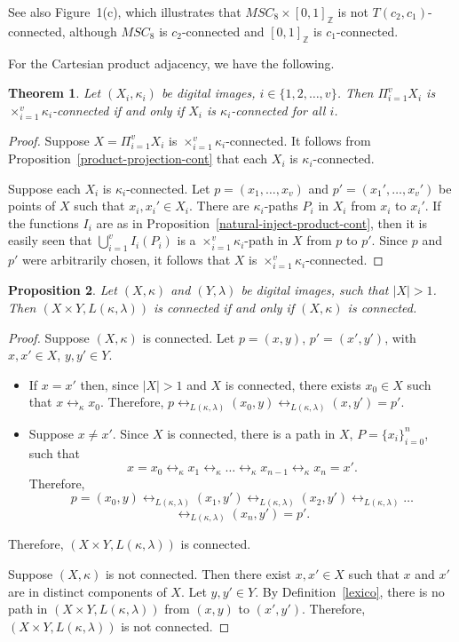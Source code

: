 \documentclass{article}
\theoremstyle{plain}
\newtheorem{thm}{Theorem}
\newtheorem{prop}[thm]{Proposition}
\theoremstyle{definition}
\numberwithin{thm}{section}
\newcommand{\adj}{\leftrightarrow}
\def\Z{{\mathbb Z}}
\begin{document}
See also %
Figure~1(c),
which illustrates that $MSC_8 \times [0,1]_{\Z}$ is
not $T(c_2,c_1)$-connected, although $MSC_8$ is $c_2$-connected and
$[0,1]_{\Z}$ is $c_1$-connected.

For the Cartesian product adjacency, we have the following.


\begin{thm}
\label{product-Pi-conn}
Let $(X_i,\kappa_i)$ be digital images, $i \in \{1,2, \ldots, v\}$. Then
$\Pi_{i=1}^v X_i$ is $\times_{i=1}^v \kappa_i$-connected if and only if $X_i$ is $\kappa_i$-connected for all $i$.
\end{thm}

\begin{proof}
Suppose $X=\Pi_{i=1}^v X_i$ is $\times_{i=1}^v \kappa_i$-connected. It follows from Proposition~\ref{product-projection-cont} that each $X_i$ is
$\kappa_i$-connected.

Suppose each $X_i$ is $\kappa_i$-connected. Let $p = (x_1, \ldots, x_v)$
and $p' = (x_1', \ldots, x_v')$ be points of $X$ such that
$x_i, x_i' \in X_i$. There are $\kappa_i$-paths $P_i$ in $X_i$ from
$x_i$ to $x_i'$. If the functions $I_i$ are as in
Proposition~\ref{natural-inject-product-cont}, then it is easily seen that
$\bigcup_{i=1}^v I_i(P_i)$ is a $\times_{i=1}^v \kappa_i$-path in $X$ from
$p$ to $p'$. Since $p$ and $p'$ were arbitrarily
chosen, it follows that $X$ is $\times_{i=1}^v \kappa_i$-connected.
\end{proof}

\begin{prop}
\label{Lex-1st-factor}
Let $(X,\kappa)$ and $(Y,\lambda)$
be digital images, such that $|X| > 1$. Then
$(X \times Y, L(\kappa,\lambda))$
is connected if and only if
$(X,\kappa)$ is connected.
\end{prop}

\begin{proof}
Suppose $(X,\kappa)$ is connected.
Let $p=(x,y)$, $p'=(x',y')$, with
$x,x' \in X$, $y,y' \in Y$.
\begin{itemize}
\item If $x=x'$ then, since $|X| > 1$ and $X$ is connected, there exists $x_0 \in X$ such that $x \adj_{\kappa} x_0$. Therefore,
$p \adj_{L(\kappa,\lambda)} (x_0,y) \adj_{L(\kappa,\lambda)}
(x,y')=p'$.
\item Suppose $x \neq x'$. Since
$X$ is connected, there
is a path in $X$, $P=\{x_i\}_{i=0}^n$, such that
\[x=x_0 \adj_{\kappa} x_1 \adj_{\kappa} \dots \adj_{\kappa} x_{n-1} \adj_{\kappa} x_n=x'.
\]
Therefore,
\[ p = (x_0,y) \adj_{L(\kappa,\lambda)} (x_1, y') \adj_{L(\kappa,\lambda)} (x_2,y')
\adj_{L(\kappa,\lambda)} \ldots \]
\[ \adj_{L(\kappa,\lambda)} (x_n,y')=p'.
\]
\end{itemize}
Therefore,
$(X \times Y, L(\kappa,\lambda))$
is connected.

Suppose $(X,\kappa)$ is not
connected. Then there exist
$x,x' \in X$ such that $x$ and
$x'$ are in distinct components
of $X$. Let $y,y' \in Y$. By
Definition~\ref{lexico},
there is no path in
$(X \times Y, L(\kappa,\lambda))$
from $(x,y)$ to $(x',y')$.
Therefore, $(X \times Y, L(\kappa,\lambda))$ is not connected.
\end{proof}
\end{document}
